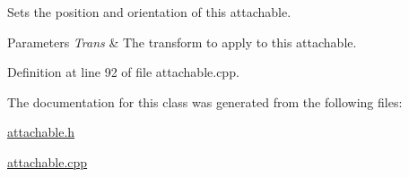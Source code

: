 Sets the position and orientation of this attachable. 


\begin{DoxyParams}{Parameters}
{\em Trans} & The transform to apply to this attachable. \\
\hline
\end{DoxyParams}


Definition at line 92 of file attachable.cpp.



The documentation for this class was generated from the following files:\begin{DoxyCompactItemize}
\item 
\hyperlink{attachable_8h}{attachable.h}\item 
\hyperlink{attachable_8cpp}{attachable.cpp}\end{DoxyCompactItemize}
